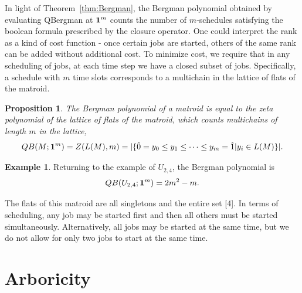\documentclass[12pt,reqno]{amsart}
\numberwithin{definition}{section}
\newtheorem{proposition}[definition]{Proposition}
\theoremstyle{definition}
\newtheorem{example}[definition]{Example}
\begin{document}





In light of Theorem~\ref{thm:Bergman}, the Bergman polynomial obtained
by evaluating QBergman at ${\bf 1}^m$ counts the number of
$m$-schedules satisfying the boolean formula prescribed by the closure
operator.  One could interpret the rank as a kind of cost function -
once certain jobs are started, others of the same rank can be added
without additional cost.  To minimize cost, we require that in any
scheduling of jobs, at each time step we have a closed subset of jobs.
Specifically, a schedule with $m$ time slots corresponds to a
multichain in the lattice of flats of the matroid.  

\begin{proposition}
The Bergman polynomial of a matroid is equal to the zeta polynomial of the lattice of flats of the matroid, which counts multichains of length $m$ in the lattice,
$$QB(M;{\bf 1}^m) = Z(L(M),m) = |\{ \hat{0} = y_0 \leq y_1 \leq \cdots \leq y_m = \hat{1} | y_i \in L(M) \}|.$$

\end{proposition}



\begin{example}
Returning to the example of $U_{2,4}$, the Bergman polynomial is
$$QB(U_{2,4};{\bf 1}^m) = 2m^2 - m.$$

The flats of this matroid are all singletons and the entire set [4].  In terms of scheduling, any job may be started first and then all others must be started simultaneously.  Alternatively, all jobs may be started at the same time, but we do not allow for only two jobs to start at the same time. 
\end{example}



\section{Arboricity}

\end{document}
